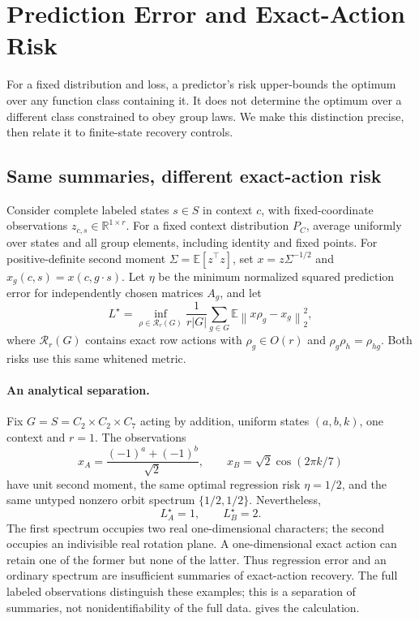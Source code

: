 \documentclass{article}
\newcommand{\R}{\mathbb{R}}
\newcommand{\norm}[1]{\left\lVert #1\right\rVert}
\begin{document}
\section{Prediction Error and Exact-Action Risk}
\label{sec:boundaries}
For a fixed distribution and loss, a predictor's risk upper-bounds the optimum over any function class containing it. It does not determine the optimum over a different class constrained to obey group laws. We make this distinction precise, then relate it to finite-state recovery controls.

\subsection{Same summaries, different exact-action risk}
Consider complete labeled states $s\in S$ in context $c$, with fixed-coordinate observations $z_{c,s}\in\R^{1\times r}$. For a fixed context distribution $P_C$, average uniformly over states and all group elements, including identity and fixed points. For positive-definite second moment $\Sigma=\mathbb E[z^\top z]$, set $x=z\Sigma^{-1/2}$ and $x_g(c,s)=x(c,g\cdot s)$. Let $\eta$ be the minimum normalized squared prediction error for independently chosen matrices $A_g$, and let
\[
 L^\star=\inf_{\rho\in\mathcal R_r(G)}
 \frac1{r|G|}\sum_{g\in G}\mathbb E\norm{x\rho_g-x_g}_2^2,
\]
where $\mathcal R_r(G)$ contains exact row actions with $\rho_g\in O(r)$ and $\rho_g\rho_h=\rho_{hg}$. Both risks use this same whitened metric.

\paragraph{An analytical separation.}
Fix $G=S=C_2\times C_2\times C_7$ acting by addition, uniform states $(a,b,k)$, one context and $r=1$. The observations
\[
 x_A=\frac{(-1)^a+(-1)^b}{\sqrt2},\qquad
 x_B=\sqrt2\cos(2\pi k/7)
\]
have unit second moment, the same optimal regression risk $\eta=1/2$, and the same untyped nonzero orbit spectrum $\{1/2,1/2\}$. Nevertheless,
\[
 \boxed{\ L_A^\star=1,\qquad L_B^\star=2.\ }
\]
The first spectrum occupies two real one-dimensional characters; the second occupies an indivisible real rotation plane. A one-dimensional exact action can retain one of the former but none of the latter. Thus regression error and an ordinary spectrum are insufficient summaries of exact-action recovery. The full labeled observations distinguish these examples; this is a separation of summaries, not nonidentifiability of the full data.  gives the calculation.
\end{document}
